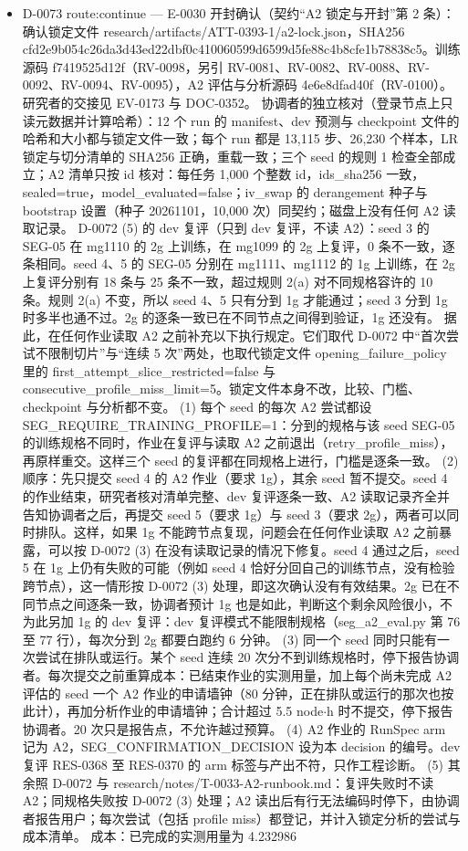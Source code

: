 \documentclass[11pt]{article}
\begin{document}
\begin{itemize}
\item D-0073 route:continue --- E-0030 开封确认（契约``A2 锁定与开封''第 2 条）：确认锁定文件 research/artifacts/ATT-0393-1/a2-lock.json，SHA256 cfd2e9b054c26da3d43ed22dbf0c410060599d6599d5fe88c4b8cfe1b78838c5。训练源码 f7419525d12f（RV-0098，另引 RV-0081、RV-0082、RV-0088、RV-0092、RV-0094、RV-0095），A2 评估与分析源码 4e6e8dfad40f（RV-0100）。研究者的交接见 EV-0173 与 DOC-0352。 协调者的独立核对（登录节点上只读元数据并计算哈希）：12 个 run 的 manifest、dev 预测与 checkpoint 文件的哈希和大小都与锁定文件一致；每个 run 都是 13,115 步、26,230 个样本，LR 锁定与切分清单的 SHA256 正确，重载一致；三个 seed 的规则 1 检查全部成立；A2 清单只按 id 核对：每任务 1,000 个整数 id，ids\_sha256 一致，sealed=true，model\_evaluated=false；iv\_swap 的 derangement 种子与 bootstrap 设置（种子 20261101，10,000 次）同契约；磁盘上没有任何 A2 读取记录。 D-0072 (5) 的 dev 复评（只到 dev 复评，不读 A2）：seed 3 的 SEG-05 在 mg1110 的 2g 上训练，在 mg1099 的 2g 上复评，0 条不一致，逐条相同。seed 4、5 的 SEG-05 分别在 mg1111、mg1112 的 1g 上训练，在 2g 上复评分别有 18 条与 25 条不一致，超过规则 2(a) 对不同规格容许的 10 条。规则 2(a) 不变，所以 seed 4、5 只有分到 1g 才能通过；seed 3 分到 1g 时多半也通不过。2g 的逐条一致已在不同节点之间得到验证，1g 还没有。 据此，在任何作业读取 A2 之前补充以下执行规定。它们取代 D-0072 中``首次尝试不限制切片''与``连续 5 次''两处，也取代锁定文件 opening\_failure\_policy 里的 first\_attempt\_slice\_restricted=false 与 consecutive\_profile\_miss\_limit=5。锁定文件本身不改，比较、门槛、checkpoint 与分析都不变。 (1) 每个 seed 的每次 A2 尝试都设 SEG\_REQUIRE\_TRAINING\_PROFILE=1：分到的规格与该 seed SEG-05 的训练规格不同时，作业在复评与读取 A2 之前退出（retry\_profile\_miss），再原样重交。这样三个 seed 的复评都在同规格上进行，门槛是逐条一致。 (2) 顺序：先只提交 seed 4 的 A2 作业（要求 1g），其余 seed 暂不提交。seed 4 的作业结束，研究者核对清单完整、dev 复评逐条一致、A2 读取记录齐全并告知协调者之后，再提交 seed 5（要求 1g）与 seed 3（要求 2g），两者可以同时排队。这样，如果 1g 不能跨节点复现，问题会在任何作业读取 A2 之前暴露，可以按 D-0072 (3) 在没有读取记录的情况下修复。seed 4 通过之后，seed 5 在 1g 上仍有失败的可能（例如 seed 4 恰好分回自己的训练节点，没有检验跨节点），这一情形按 D-0072 (3) 处理，即这次确认没有有效结果。2g 已在不同节点之间逐条一致，协调者预计 1g 也是如此，判断这个剩余风险很小，不为此另加 1g 的 dev 复评：dev 复评模式不能限制规格（seg\_a2\_eval.py 第 76 至 77 行），每次分到 2g 都要白跑约 6 分钟。 (3) 同一个 seed 同时只能有一次尝试在排队或运行。某个 seed 连续 20 次分不到训练规格时，停下报告协调者。每次提交之前重算成本：已结束作业的实测用量，加上每个尚未完成 A2 评估的 seed 一个 A2 作业的申请墙钟（80 分钟，正在排队或运行的那次也按此计），再加分析作业的申请墙钟；合计超过 5.5 node\ensuremath{\cdot}h 时不提交，停下报告协调者。20 次只是报告点，不允许越过预算。 (4) A2 作业的 RunSpec arm 记为 A2，SEG\_CONFIRMATION\_DECISION 设为本 decision 的编号。dev 复评 RES-0368 至 RES-0370 的 arm 标签与产出不符，只作工程诊断。 (5) 其余照 D-0072 与 research/notes/T-0033-A2-runbook.md：复评失败时不读 A2；同规格失败按 D-0072 (3) 处理；A2 读出后有行无法编码时停下，由协调者报告用户；每次尝试（包括 profile miss）都登记，并计入锁定分析的尝试与成本清单。 成本：已完成的实测用量为 4.232986 
\end{itemize}
\end{document}
